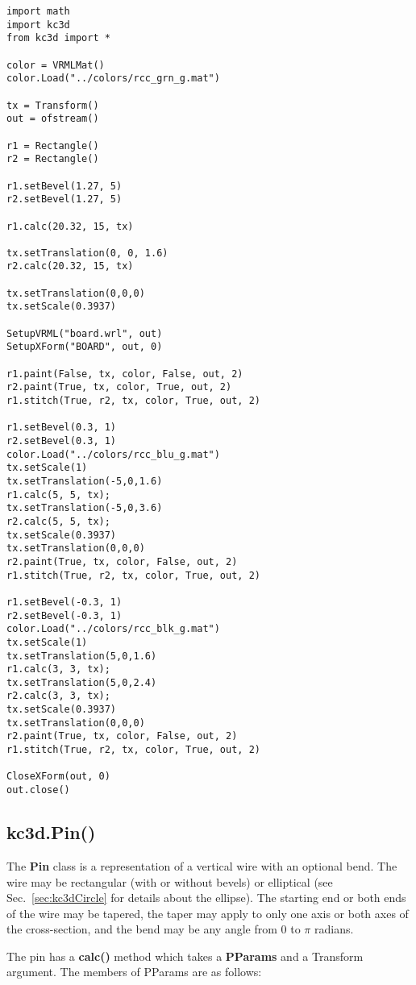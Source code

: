 \documentclass[a4paper, dvipdfm]{article}
\begin{document}
\begin{verbatim}
import math
import kc3d
from kc3d import *

color = VRMLMat()
color.Load("../colors/rcc_grn_g.mat")

tx = Transform()
out = ofstream()

r1 = Rectangle()
r2 = Rectangle()

r1.setBevel(1.27, 5)
r2.setBevel(1.27, 5)

r1.calc(20.32, 15, tx)

tx.setTranslation(0, 0, 1.6)
r2.calc(20.32, 15, tx)

tx.setTranslation(0,0,0)
tx.setScale(0.3937)

SetupVRML("board.wrl", out)
SetupXForm("BOARD", out, 0)

r1.paint(False, tx, color, False, out, 2)
r2.paint(True, tx, color, True, out, 2)
r1.stitch(True, r2, tx, color, True, out, 2)

r1.setBevel(0.3, 1) 
r2.setBevel(0.3, 1) 
color.Load("../colors/rcc_blu_g.mat")
tx.setScale(1)
tx.setTranslation(-5,0,1.6)
r1.calc(5, 5, tx);
tx.setTranslation(-5,0,3.6)
r2.calc(5, 5, tx);
tx.setScale(0.3937)
tx.setTranslation(0,0,0)
r2.paint(True, tx, color, False, out, 2)
r1.stitch(True, r2, tx, color, True, out, 2)

r1.setBevel(-0.3, 1) 
r2.setBevel(-0.3, 1) 
color.Load("../colors/rcc_blk_g.mat")
tx.setScale(1)
tx.setTranslation(5,0,1.6)
r1.calc(3, 3, tx);
tx.setTranslation(5,0,2.4)
r2.calc(3, 3, tx);
tx.setScale(0.3937)
tx.setTranslation(0,0,0)
r2.paint(True, tx, color, False, out, 2)
r1.stitch(True, r2, tx, color, True, out, 2)

CloseXForm(out, 0)
out.close()
\end{verbatim}

\subsection{kc3d.Pin()}
The \textbf{Pin} class is a representation of a vertical wire with an optional bend. The wire
may be rectangular (with or without bevels) or elliptical (see Sec.~\ref{sec:kc3dCircle} for
details about the ellipse). The starting end or both ends of the wire may be tapered, the taper
may apply to only one axis or both axes of the cross-section, and the bend may be any angle
from 0 to $\pi$ radians. 

The pin has a \textbf{calc()} method which takes a \textbf{PParams} and a Transform
argument. The members of PParams are as follows:
\end{document}
